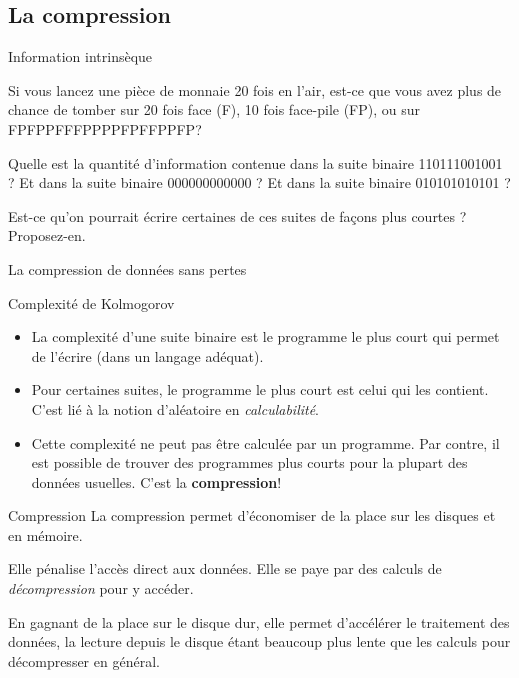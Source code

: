 \subsection{La compression}
\begin{exercice}
  \begin{exercicelet}{Information intrinsèque}
    \begin{questions}
    \item Si vous lancez une pièce de monnaie 20 fois en l'air, est-ce que
      vous avez plus de chance de tomber sur 20 fois face (F), 10 fois
      face-pile (FP), ou sur FPFPPFFFPPPPFPFFPPFP?
    \item Quelle est la quantité d'information contenue dans la suite binaire
      110111001001 ?  Et dans la suite binaire 000000000000 ? Et dans la suite
      binaire 010101010101 ?
    \item Est-ce qu'on pourrait écrire certaines de ces suites de façons plus
      courtes ? Proposez-en.
    \end{questions}
  \end{exercicelet}
\end{exercice}
\begin{frame}{La compression de données sans pertes}
  \begin{block}{Complexité de Kolmogorov}
    \begin{itemize}
    \item[\ddialoginformation] La complexité d'une suite binaire est le
      programme le plus court qui permet de l'écrire (dans un langage
      adéquat).
      
    \item[\ddialogwarning] Pour certaines suites, le programme le plus court
      est celui qui les contient. C'est lié à la notion d'aléatoire en
      \emph{calculabilité}.

    \item[\ddialogerror] Cette complexité ne peut pas être calculée par un
      programme. Par contre, il est possible de trouver des programmes plus
      courts pour la plupart des données usuelles. C'est la
      \textbf{compression}!
    \end{itemize}
  \end{block}
  \begin{block}{Compression}
    La compression permet d'économiser de la place sur les disques et en
    mémoire.

    Elle pénalise l'accès direct aux données. Elle se paye par des calculs de
    \emph{décompression} pour y accéder.

    En gagnant de la place sur le disque dur, elle permet d'accélérer le
    traitement des données, la lecture depuis le disque étant beaucoup plus
    lente que les calculs pour décompresser en général.
  \end{block}
\end{frame}
